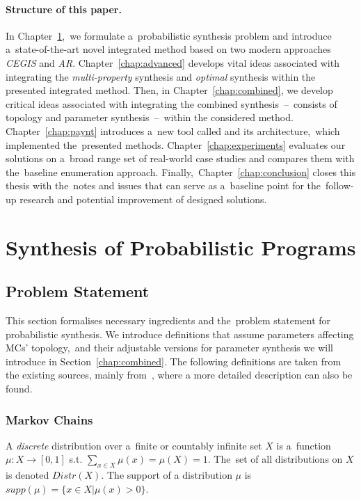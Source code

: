 \subsubsection*{Structure of this paper.}
In Chapter~\ref{chap:synthesis},~we formulate a~probabilistic synthesis problem and introduce a~state-of-the-art novel integrated method based on two modern approaches \textit{CEGIS} and \textit{AR}.
Chapter~\ref{chap:advanced} develops vital ideas associated with integrating the \textit{multi-property} synthesis and \textit{optimal} synthesis within the presented integrated method.
Then, in Chapter~\ref{chap:combined}, we develop critical ideas associated with integrating the combined synthesis \,--\, consists of topology and parameter synthesis \,--\, within the considered method.
Chapter~\ref{chap:paynt} introduces a~new tool called \toolname{} and its architecture,~which implemented the~presented methods.
Chapter~\ref{chap:experiments} evaluates our solutions on a~broad range set of real-world case studies and compares them with the~baseline enumeration approach.
Finally,~Chapter~\ref{chap:conclusion} closes this thesis with the~notes
and issues that can serve as a~baseline point for the~follow-up research and potential improvement of designed solutions.

\chapter{Synthesis of Probabilistic Programs}\label{chap:synthesis}

\section{Problem Statement}
This section formalises necessary ingredients and the~problem statement for probabilistic synthesis.
We introduce definitions that assume parameters affecting MCs' topology,~and their adjustable versions for parameter synthesis we will introduce in Section~\ref{chap:combined}.
The following definitions are taken from the existing sources, mainly from~\cite{roman-DP,tacas21}, where a more detailed description can also be found.

\subsection{Markov Chains}

\begin{definition}[Distribution]
\cite{tacas21} 
    A \textit{discrete} distribution over a~finite or countably infinite set $X$ is a~function $\mu: X \rightarrow [0,1]$ s.t. $\sum_{x \in X} \mu(x) = \mu(X) = 1$.
    The~set of all distributions on $X$ is denoted $Distr(X)$.
    The support of a distribution $\mu$ is $supp(\mu) = \{ x \in X \lvert \mu(x) > 0 \}$.
\end{definition}

